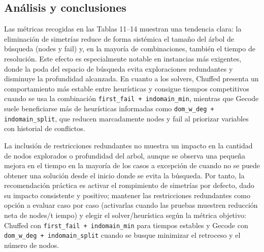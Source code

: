 
\subsection{Análisis y conclusiones}\label{sec:06-rectangulo-analisis}
Las métricas recogidas en las Tablas 11–14 muestran una tendencia clara: la eliminación de simetrías reduce de forma sistémica el tamaño del árbol de búsqueda (nodes y fail) y, en la mayoría de combinaciones, también el tiempo de resolución. Este efecto es especialmente notable en instancias más exigentes, donde la poda del espacio de búsqueda evita exploraciones redundantes y disminuye la profundidad alcanzada. En cuanto a los solvers, Chuffed presenta un comportamiento más estable entre heurísticas y consigue tiempos competitivos cuando se usa la combinación \texttt{first\_fail + indomain\_min}, mientras que Gecode suele beneficiarse más de heurísticas informadas como \texttt{dom\_w\_deg + indomain\_split}, que reducen marcadamente nodes y fail al priorizar variables con historial de conflictos.

La inclusión de restricciones redundantes no muestra un impacto en la cantidad de nodos explorados o profundidad del arbol, aunque se observa una pequeña mejora en el tiempo en la mayoría de los casos a excepción de cuando no se puede obtener una solución desde el inicio donde se evita la búsqueda. Por tanto, la recomendación práctica es activar el rompimiento de simetrías por defecto, dado su impacto consistente y positivo; mantener las restricciones redundantes como opción a evaluar caso por caso (activarlas cuando las pruebas muestren reducción neta de nodes/t iempo) y elegir el solver/heurística según la métrica objetivo: Chuffed con \texttt{first\_fail + indomain\_min} para tiempos estables y Gecode con \texttt{dom\_w\_deg + indomain\_split} cuando se busque minimizar el retroceso y el número de nodos.
